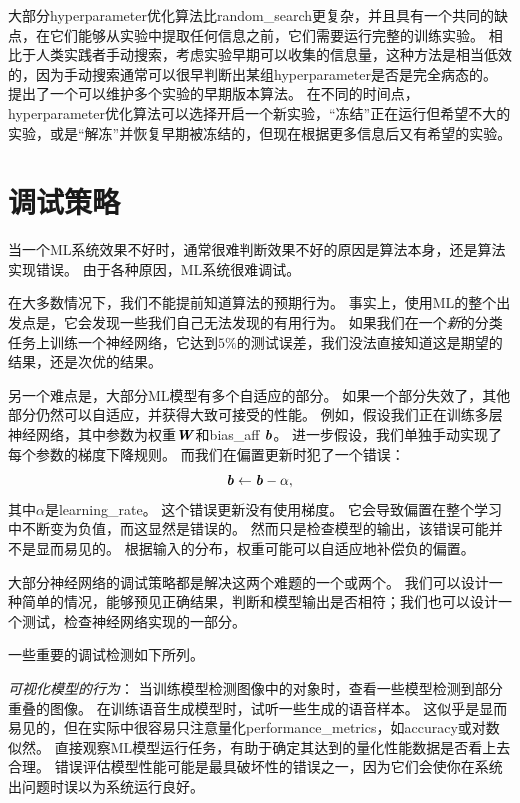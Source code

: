 
大部分\gls{hyperparameter}优化算法比\gls{random_search}更复杂，并且具有一个共同的缺点，在它们能够从实验中提取任何信息之前，它们需要运行完整的训练实验。
相比于人类实践者手动搜索，考虑实验早期可以收集的信息量，这种方法是相当低效的，因为手动搜索通常可以很早判断出某组\gls{hyperparameter}是否是完全病态的。
\cite{swersky2014freeze}提出了一个可以维护多个实验的早期版本算法。
在不同的时间点，\gls{hyperparameter}优化算法可以选择开启一个新实验，``冻结''正在运行但希望不大的实验，或是``解冻''并恢复早期被冻结的，但现在根据更多信息后又有希望的实验。

\section{调试策略}
\label{sec:debugging_strategies}
当一个\gls{ML}系统效果不好时，通常很难判断效果不好的原因是算法本身，还是算法实现错误。
由于各种原因，\gls{ML}系统很难调试。

在大多数情况下，我们不能提前知道算法的预期行为。
事实上，使用\gls{ML}的整个出发点是，它会发现一些我们自己无法发现的有用行为。
如果我们在一个\emph{新}的分类任务上训练一个神经网络，它达到$5\%$的测试误差，我们没法直接知道这是期望的结果，还是次优的结果。

另一个难点是，大部分\gls{ML}模型有多个自适应的部分。
如果一个部分失效了，其他部分仍然可以自适应，并获得大致可接受的性能。
例如，假设我们正在训练多层神经网络，其中参数为权重$\boldsymbol{\mathit{W}}$和\gls{bias_aff} $\boldsymbol{\mathit{b}}$。
进一步假设，我们单独手动实现了每个参数的梯度下降规则。
而我们在偏置更新时犯了一个错误：
\begin{equation}
	\boldsymbol{\mathit{b}} \leftarrow \boldsymbol{\mathit{b}} - \alpha,
\end{equation}
其中$\alpha$是\gls{learning_rate}。
这个错误更新没有使用梯度。
它会导致偏置在整个学习中不断变为负值，而这显然是错误的。 
然而只是检查模型的输出，该错误可能并不是显而易见的。
根据输入的分布，权重可能可以自适应地补偿负的偏置。


大部分神经网络的调试策略都是解决这两个难题的一个或两个。
我们可以设计一种简单的情况，能够预见正确结果，判断和模型输出是否相符；我们也可以设计一个测试，检查神经网络实现的一部分。

一些重要的调试检测如下所列。

\emph{可视化模型的行为}：
当训练模型检测图像中的对象时，查看一些模型检测到部分重叠的图像。
在训练语音生成模型时，试听一些生成的语音样本。
这似乎是显而易见的，但在实际中很容易只注意量化\gls{performance_metrics}，如\gls{accuracy}或对数似然。
直接观察\gls{ML}模型运行任务，有助于确定其达到的量化性能数据是否看上去合理。
错误评估模型性能可能是最具破坏性的错误之一，因为它们会使你在系统出问题时误以为系统运行良好。

